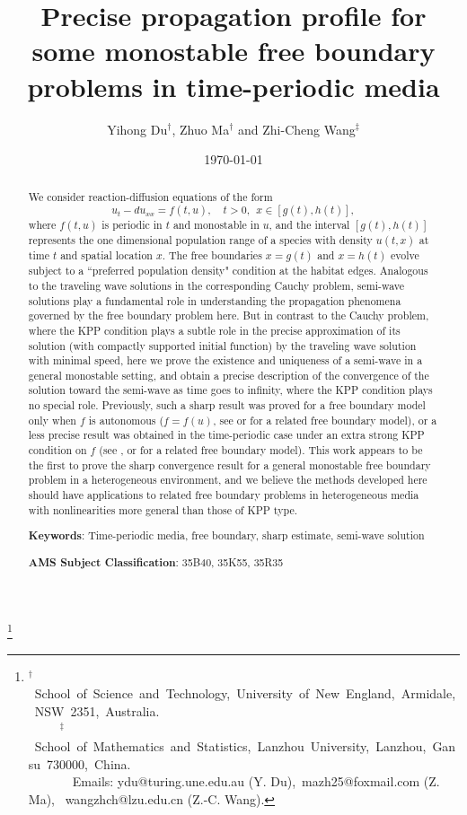 \documentclass[11pt]{amsart}
\numberwithin{equation}{section}
\begin{document}
\title[Precise propagation profile for   monostable free boundary problems]{Precise propagation profile for some monostable free boundary problems in time-periodic media}
\author[Y. Du, Z. Ma and Z.-C. Wang ]{Yihong Du$^\dag$, Zhuo Ma$^\dag$ and Zhi-Cheng Wang$^\ddag$}
 \thanks{
 \mbox{$^{\dag}$ School of Science and Technology, University of New England, Armidale, NSW 2351, Australia.} \\
 \mbox{\ \ \ \ \  $^{\ddag}$ School of Mathematics and Statistics, Lanzhou University, Lanzhou, Gansu 730000, China.} \\
\mbox{\ \ \ \ \ \ \    Emails:}  ydu@turing.une.edu.au (Y. Du),\ mazh25@foxmail.com (Z. Ma), \ wangzhch@lzu.edu.cn (Z.-C. Wang).
}
\date{\today}
\maketitle 
\begin{abstract}
  We consider  reaction-diffusion equations of the form
\begin{equation*}
u_t - d u_{xx} = f(t,u), \quad t>0,\ \ x \in [g(t), h(t)],
\end{equation*}
where $f(t,u)$ is periodic in $t$ and monostable in $u$, and the interval $[g(t), h(t)]$ represents the one dimensional population range of a species with density $u(t,x)$ at time $t$ and spatial location $x$.  The free boundaries $x=g(t)$ and $x=h(t)$ evolve subject to a ``preferred population density" condition at the habitat edges.
Analogous to the traveling wave solutions in the corresponding Cauchy problem, semi-wave solutions play a fundamental role in understanding the propagation phenomena governed by the  free boundary problem here.  But in contrast to the  Cauchy problem, where the KPP condition plays a subtle role in the precise approximation of its solution (with compactly supported initial function) by the traveling wave solution with minimal speed, here we  prove the existence and uniqueness of a semi-wave in a general monostable setting,  and  obtain a precise description of the convergence of the solution toward the semi-wave as time goes to infinity, where the KPP condition plays no special role. Previously,  such a sharp result was proved for a free boundary model only when $f$ is autonomous ($f=f(u)$, see \cite{D} or \cite{DL15} for a related free boundary model), or  a less precise result was obtained in the time-periodic case under an extra strong KPP condition on $f$ (see \cite{MDW}, or \cite{DGP} for a related free boundary model). This work appears to be the first to prove the sharp convergence result for a general monostable free boundary problem in a heterogeneous environment,
and we believe the methods developed here should have applications to related free boundary problems in heterogeneous media with nonlinearities more general than those of KPP type.

\bigskip
\textbf{Keywords}: Time-periodic media, free boundary,   sharp estimate, semi-wave solution

\medskip 
\textbf{AMS Subject Classification}: 35B40, 35K55, 35R35
\end{abstract}
\end{document}

